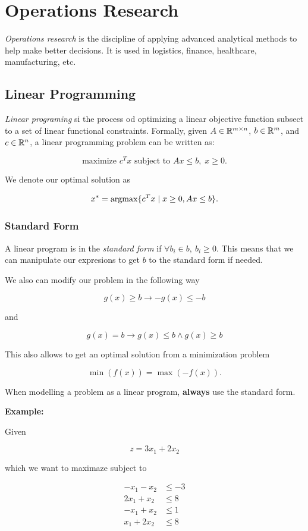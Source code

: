 \chapter{Operations Research}

\emph{Operations research} is the discipline of applying advanced analytical methods to help
make better decisions. It is used in logistics, finance, healthcare, manufacturing, etc.

\section{Linear Programming}

\emph{Linear programing} si the process od optimizing a linear objective function subsect to a set of linear functional constraints.
Formally, given \(A \in \mathbb{R}^{m \times n}\), \(b \in \mathbb{R}^m\), and \(c \in \mathbb{R}^n\), a linear programming problem can be written as:

\[
	\text{maximize } c^T x \text{ subject to } Ax \le b, \; x \ge 0.
\]

We denote our optimal solution as

\[
	x^{*} = \mathrm{argmax} \{c^T x \mid x \ge 0, Ax \le b\}.
\]

\subsection{Standard Form}

A linear program is in the \emph{standard form} if \(\forall b_i \in b, \ b_i \ge 0\). This means that we can manipulate our
expresions to get \(b\) to the standard form if needed.

We also can modify our problem in the following way

\[
	g(x) \ge b \to -g(x) \le -b
\]

and

\[
	g(x) = b \to g(x) \le b \land g(x) \ge b
\]

This also allows to get an optimal solution from a minimization problem

\[
	\min(f(x)) = \max (-f(x)).
\]

When modelling a problem as a linear program, \textbf{always} use the standard form.

\textbf{Example:}

Given

\[
	z = 3 x_1 + 2 x_2
\]

which we want to maximaze subject to

\begin{align*}
	-x_1 - x_2 & \le -3 \\
	2x_1 + x_2 & \le 8  \\
	-x_1 + x_2 & \le 1  \\
	x_1 + 2x_2 & \le 8  \\
\end{align*}

